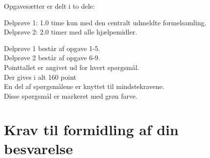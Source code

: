 \documentclass[12pt,x11names,a4paper]{article}
\begin{document}


\begin{center}
Opgavesætter er delt i to dele:\\
\end{center}
Delprøve 1: 1.0 time kun med den centralt udmeldte formelsamling.\\
Delprøve 2: 2.0 timer med alle hjælpemidler.
\begin{center}
Delprøve 1 består af opgave 1-5.\\
Delprøve 2 består af opgave 6-9.\\
Pointtallet er angivet ud for hvert spørgsmål.\\
Der gives i alt 160 point\\


En del af spørgsmålene er knyttet til mindstekravene.\\
Disse spørgsmål er markeret med grøn farve. 
\end{center}
\section*{Krav til formidling af din besvarelse}
\end{document}
